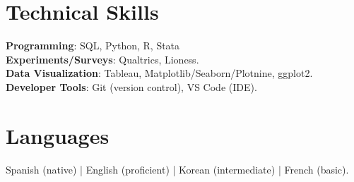 \documentclass[letterpaper,11pt]{article}
\begin{document}
\section{Technical Skills}
 \begin{itemize}[leftmargin=0.15in, label={}]
    \small{\item{
     \textbf{Programming}{: SQL, Python, R, Stata%
     } \\
    \textbf{Experiments/Surveys}{: Qualtrics, Lioness.}  \\
     \textbf{Data Visualization}{: Tableau, Matplotlib/Seaborn/Plotnine, ggplot2.} \\
     \textbf{Developer Tools}{: Git (version control), VS Code (IDE).}\\

    }}
 \end{itemize}

 
\section{Languages}
 \begin{itemize}[leftmargin=0.15in, label={}]
    \small{\item{
     \textbf{}{Spanish (native) | English (proficient) | Korean (intermediate) | French (basic).} \\
    }}
 \end{itemize}


\end{document}
